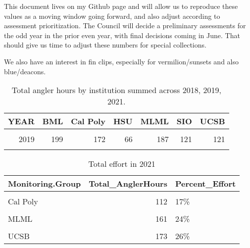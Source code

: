 \documentclass[
]{article}
\begin{document}
This document lives on my Github page and will allow us to reproduce these values
as a moving window going forward, and also adjust according to assessment
prioritization. The Council will decide a preliminary assessments for the odd year
in the prior even year, with final decisions coming in June. That should give us
time to adjust these numbers for special collections.

We also have an interest in fin clips, especially for vermilion/sunsets and also
blue/deacons.

\newpage

\begin{table}

\caption{\label{tab:anghrs}Total angler hours by institution summed across 2018, 2019, 2021.}
\centering
\begin{tabular}[t]{rrrrrrr}
\toprule
YEAR & BML & Cal Poly & HSU & MLML & SIO & UCSB\\
\midrule
\cellcolor{gray!6}{2018} & \cellcolor{gray!6}{179} & \cellcolor{gray!6}{188} & \cellcolor{gray!6}{71} & \cellcolor{gray!6}{175} & \cellcolor{gray!6}{103} & \cellcolor{gray!6}{128}\\
2019 & 199 & 172 & 66 & 187 & 121 & 121\\
\cellcolor{gray!6}{2021} & \cellcolor{gray!6}{110} & \cellcolor{gray!6}{112} & \cellcolor{gray!6}{66} & \cellcolor{gray!6}{161} & \cellcolor{gray!6}{51} & \cellcolor{gray!6}{173}\\
\bottomrule
\end{tabular}
\end{table}

\begin{table}

\caption{\label{tab:effort2021}Total effort in 2021}
\centering
\begin{tabular}[t]{lrl}
\toprule
Monitoring.Group & Total\_AnglerHours & Percent\_Effort\\
\midrule
\cellcolor{gray!6}{BML} & \cellcolor{gray!6}{110} & \cellcolor{gray!6}{16\%}\\
Cal Poly & 112 & 17\%\\
\cellcolor{gray!6}{HSU} & \cellcolor{gray!6}{66} & \cellcolor{gray!6}{10\%}\\
MLML & 161 & 24\%\\
\cellcolor{gray!6}{SIO} & \cellcolor{gray!6}{51} & \cellcolor{gray!6}{8\%}\\
\addlinespace
UCSB & 173 & 26\%\\
\bottomrule
\end{tabular}
\end{table}
\end{document}
